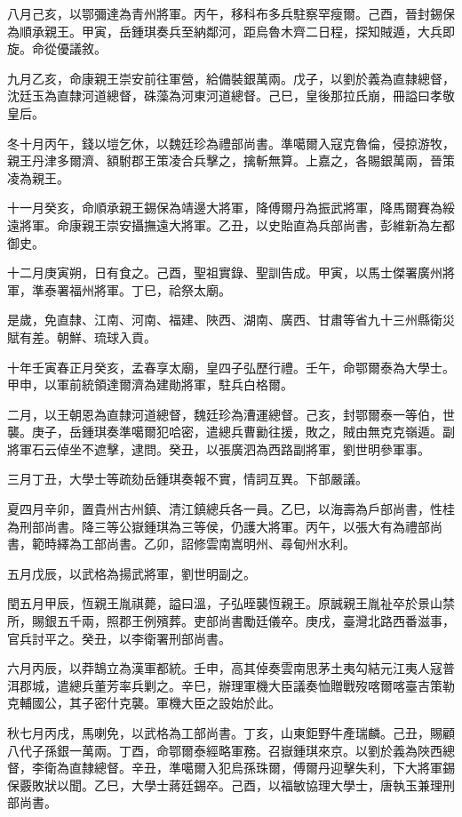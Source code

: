 \begin{pinyinscope}
八月己亥，以鄂彌達為青州將軍。丙午，移科布多兵駐察罕瘦爾。己酉，晉封錫保為順承親王。甲寅，岳鍾琪奏兵至納鄰河，距烏魯木齊二日程，探知賊遁，大兵即旋。命從優議敘。

九月乙亥，命康親王崇安前往軍營，給備裝銀萬兩。戊子，以劉於義為直隸總督，沈廷玉為直隸河道總督，硃藻為河東河道總督。己巳，皇後那拉氏崩，冊謚曰孝敬皇后。

冬十月丙午，錢以塏乞休，以魏廷珍為禮部尚書。準噶爾入寇克魯倫，侵掠游牧，親王丹津多爾濟、額駙郡王策凌合兵擊之，擒斬無算。上嘉之，各賜銀萬兩，晉策凌為親王。

十一月癸亥，命順承親王錫保為靖邊大將軍，降傅爾丹為振武將軍，降馬爾賽為綏遠將軍。命康親王崇安攝撫遠大將軍。乙丑，以史貽直為兵部尚書，彭維新為左都御史。

十二月庚寅朔，日有食之。己酉，聖祖實錄、聖訓告成。甲寅，以馬士傑署廣州將軍，準泰署福州將軍。丁巳，祫祭太廟。

是歲，免直隸、江南、河南、福建、陜西、湖南、廣西、甘肅等省九十三州縣衛災賦有差。朝鮮、琉球入貢。

十年壬寅春正月癸亥，孟春享太廟，皇四子弘歷行禮。壬午，命鄂爾泰為大學士。甲申，以軍前統領達爾濟為建勛將軍，駐兵白格爾。

二月，以王朝恩為直隸河道總督，魏廷珍為漕運總督。己亥，封鄂爾泰一等伯，世襲。庚子，岳鍾琪奏準噶爾犯哈密，遣總兵曹勷往援，敗之，賊由無克克嶺遁。副將軍石云倬坐不遮擊，逮問。癸丑，以張廣泗為西路副將軍，劉世明參軍事。

三月丁丑，大學士等疏劾岳鍾琪奏報不實，情詞互異。下部嚴議。

夏四月辛卯，置貴州古州鎮、清江鎮總兵各一員。乙巳，以海壽為戶部尚書，性桂為刑部尚書。降三等公嶽鍾琪為三等侯，仍護大將軍。丙午，以張大有為禮部尚書，範時繹為工部尚書。乙卯，詔修雲南嵩明州、尋甸州水利。

五月戊辰，以武格為揚武將軍，劉世明副之。

閏五月甲辰，恆親王胤祺薨，謚曰溫，子弘晊襲恆親王。原誠親王胤祉卒於景山禁所，賜銀五千兩，照郡王例殯葬。吏部尚書勵廷儀卒。庚戌，臺灣北路西番滋事，官兵討平之。癸丑，以李衛署刑部尚書。

六月丙辰，以莽鵠立為漢軍都統。壬申，高其倬奏雲南思茅土夷勾結元江夷人寇普洱郡城，遣總兵董芳率兵剿之。辛巳，辦理軍機大臣議奏恤贈戰歿喀爾喀臺吉策勒克輔國公，其子密什克襲。軍機大臣之設始於此。

秋七月丙戌，馬喇免，以武格為工部尚書。丁亥，山東鉅野牛產瑞麟。己丑，賜顧八代子孫銀一萬兩。丁酉，命鄂爾泰經略軍務。召嶽鍾琪來京。以劉於義為陜西總督，李衛為直隸總督。辛丑，準噶爾入犯烏孫珠爾，傅爾丹迎擊失利，下大將軍錫保覈敗狀以聞。乙巳，大學士蔣廷錫卒。己酉，以福敏協理大學士，唐執玉兼理刑部尚書。


\end{pinyinscope}
